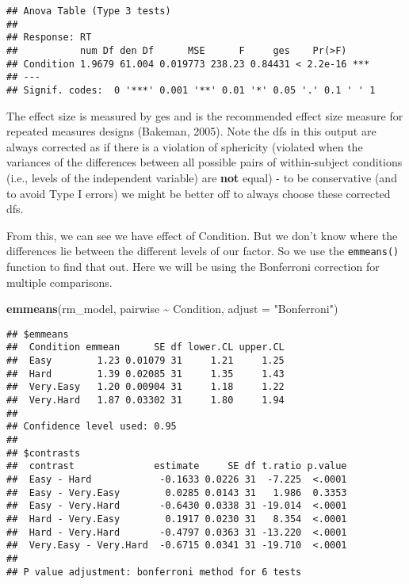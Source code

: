 \documentclass[
]{book}
\newenvironment{Shaded}{\begin{snugshade}}{\end{snugshade}}
\newcommand{\AttributeTok}[1]{\textcolor[rgb]{0.13,0.29,0.53}{#1}}
\newcommand{\FunctionTok}[1]{\textcolor[rgb]{0.13,0.29,0.53}{\textbf{#1}}}
\newcommand{\NormalTok}[1]{#1}
\newcommand{\SpecialCharTok}[1]{\textcolor[rgb]{0.81,0.36,0.00}{\textbf{#1}}}
\newcommand{\StringTok}[1]{\textcolor[rgb]{0.31,0.60,0.02}{#1}}
\begin{document}
\begin{verbatim}
## Anova Table (Type 3 tests)
## 
## Response: RT
##           num Df den Df      MSE      F     ges    Pr(>F)    
## Condition 1.9679 61.004 0.019773 238.23 0.84431 < 2.2e-16 ***
## ---
## Signif. codes:  0 '***' 0.001 '**' 0.01 '*' 0.05 '.' 0.1 ' ' 1
\end{verbatim}

The effect size is measured by ges and is the recommended effect size measure for repeated measures designs (Bakeman, 2005). Note the dfs in this output are always corrected as if there is a violation of sphericity (violated when the variances of the differences between all possible pairs of within-subject conditions (i.e., levels of the independent variable) are \textbf{not} equal) - to be conservative (and to avoid Type I errors) we might be better off to always choose these corrected dfs.

From this, we can see we have effect of Condition. But we don't know where the differences lie between the different levels of our factor. So we use the \texttt{emmeans()} function to find that out. Here we will be using the Bonferroni correction for multiple comparisons.

\begin{Shaded}
\begin{Highlighting}[]
\FunctionTok{emmeans}\NormalTok{(rm\_model, pairwise }\SpecialCharTok{\textasciitilde{}}\NormalTok{ Condition, }\AttributeTok{adjust =} \StringTok{"Bonferroni"}\NormalTok{)}
\end{Highlighting}
\end{Shaded}

\begin{verbatim}
## $emmeans
##  Condition emmean      SE df lower.CL upper.CL
##  Easy        1.23 0.01079 31     1.21     1.25
##  Hard        1.39 0.02085 31     1.35     1.43
##  Very.Easy   1.20 0.00904 31     1.18     1.22
##  Very.Hard   1.87 0.03302 31     1.80     1.94
## 
## Confidence level used: 0.95 
## 
## $contrasts
##  contrast              estimate     SE df t.ratio p.value
##  Easy - Hard            -0.1633 0.0226 31  -7.225  <.0001
##  Easy - Very.Easy        0.0285 0.0143 31   1.986  0.3353
##  Easy - Very.Hard       -0.6430 0.0338 31 -19.014  <.0001
##  Hard - Very.Easy        0.1917 0.0230 31   8.354  <.0001
##  Hard - Very.Hard       -0.4797 0.0363 31 -13.220  <.0001
##  Very.Easy - Very.Hard  -0.6715 0.0341 31 -19.710  <.0001
## 
## P value adjustment: bonferroni method for 6 tests
\end{verbatim}
\end{document}
